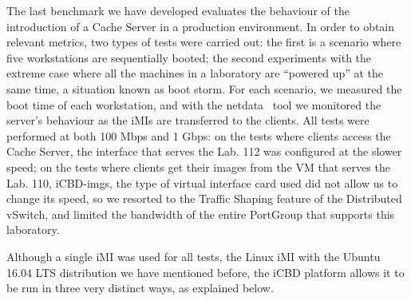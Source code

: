 

The last benchmark we have developed evaluates the behaviour of the introduction of a Cache Server in a production environment. In order to obtain relevant metrics, two types of tests were carried out: the first is a scenario where five workstations are sequentially booted; the second experiments with the extreme case where all the machines in a laboratory are ``powered up'' at the same time, a situation known as boot storm. For each scenario, we measured the boot time of each workstation, and with the netdata~\cite{netdata} tool we monitored the server's behaviour as the iMIs are transferred to the clients. All tests were performed at both 100 Mbps and 1 Gbps: on the tests where clients access the Cache Server, the interface that serves the Lab. 112 was configured at the slower speed; on the tests where clients get their images from the VM that serves the Lab. 110, iCBD-imgs, the type of virtual interface card used did not allow us to change its speed, so we resorted to the Traffic Shaping feature of the Distributed vSwitch, and limited the bandwidth of the entire PortGroup that supports this laboratory.

Although a single iMI was used for all tests, the Linux iMI with the Ubuntu 16.04 LTS distribution we have mentioned before, the iCBD platform allows it to be run in three very distinct ways, as explained below.


